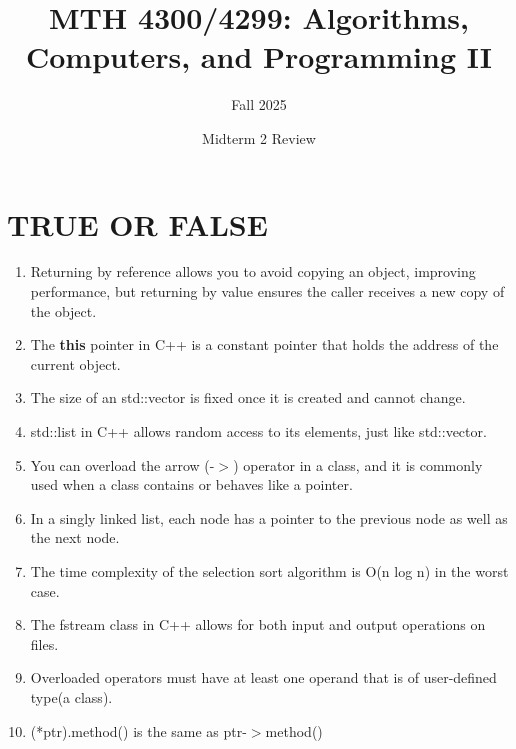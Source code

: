 \documentclass[a4paper]{article}
\title{MTH 4300/4299: Algorithms, Computers, and Programming II}
\author{Fall 2025}
\date{Midterm 2 Review}
\begin{document}
\maketitle


\section{TRUE OR FALSE}
\begin{enumerate}
    \item  Returning by reference allows you to avoid copying an object, 
           improving performance, but returning by value ensures the caller
           receives a new copy of the object.
    \item The \textbf{this} pointer in C++ is a constant pointer that holds the address
          of the current object.
    \item The size of an std::vector is fixed once it is created and cannot change.
    \item std::list in C++ allows random access to its elements, just like std::vector.
    \item You can overload the arrow (-$>$) operator in a class, and it is commonly
          used when a class contains or behaves like a pointer.
    \item In a singly linked list, each node has a pointer to the previous node as well as the next node.
    \item The time complexity of the selection sort algorithm is O(n log n) in the worst case.
    \item The fstream class in C++ allows for both input and output operations on files.
    \item Overloaded operators must have at least one operand that is of user-defined type(a class).
    \item (*ptr).method() is the same as ptr-$>$method()  
\end{enumerate}
\newpage
\end{document}
